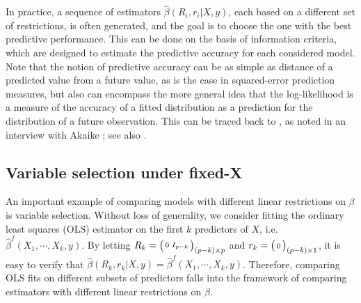 In practice, a sequence of estimators $\hat\beta(R_i,r_i|X,y)$, each based on a different set of restrictions, is often generated, and the goal is to choose the one with the best predictive performance. This can be done on the basis of information criteria, which are designed to estimate the predictive accuracy for each considered model. Note that the notion of predictive accuracy can be as simple as distance of a predicted value from a future value, as is the case in squared-error prediction measures, but also can encompass the more general idea that the log-likelihood is a measure of the accuracy of a fitted distribution as a prediction for the distribution of a future observation. This can be traced back to \citet{Akaike1973}, as noted in an interview with Akaike \citep{findley1995conversation}; see also \citet{efron1986biased}. 

\subsection{Variable selection under fixed-X}
\label{sec:intro_subsetselection}
An important example of comparing models with different linear restrictions on $\beta$ is variable selection. Without loss of generality, we consider fitting the ordinary least squares (OLS) estimator on the first $k$ predictors of $X$, i.e. $\hat\beta^f(X_1,\cdots,X_k,y)$. By letting $R_k= \big(\begin{smallmatrix}0 & I_{p-k}\end{smallmatrix}\big)_{(p-k) \times p} $ and $r_k = \big(\begin{smallmatrix}0\end{smallmatrix}\big)_{(p-k) \times 1}$, it is easy to verify that $\hat{\beta}(R_k,r_k|X,y)=\hat\beta^f(X_1,\cdots,X_k,y)$. Therefore, comparing OLS fits on different subsets of predictors falls into the framework of comparing estimators with different linear restrictions on $\beta$.

